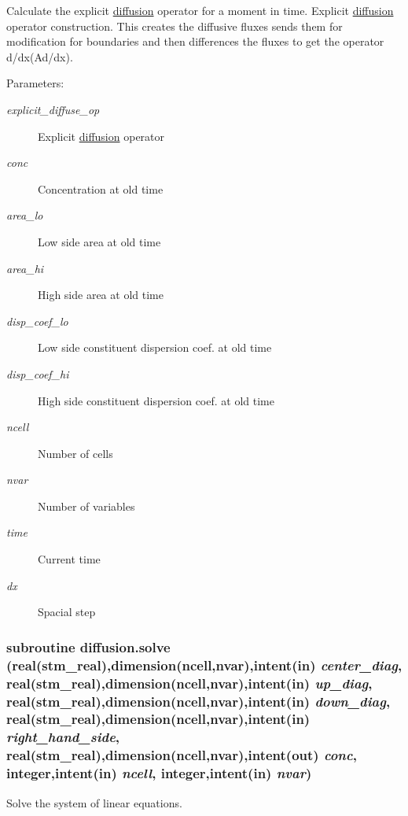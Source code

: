 Calculate the explicit \hyperlink{a00056}{diffusion} operator for a moment in time. Explicit \hyperlink{a00056}{diffusion} operator construction. This creates the diffusive fluxes sends them for modification for boundaries and then differences the fluxes to get the operator d/dx(Ad/dx). 

\begin{Desc}
\item[Parameters:]
\begin{description}
\item[{\em explicit\_\-diffuse\_\-op}]Explicit \hyperlink{a00056}{diffusion} operator\item[{\em conc}]Concentration at old time\item[{\em area\_\-lo}]Low side area at old time\item[{\em area\_\-hi}]High side area at old time \item[{\em disp\_\-coef\_\-lo}]Low side constituent dispersion coef. at old time\item[{\em disp\_\-coef\_\-hi}]High side constituent dispersion coef. at old time\item[{\em ncell}]Number of cells\item[{\em nvar}]Number of variables\item[{\em time}]Current time\item[{\em dx}]Spacial step \end{description}
\end{Desc}
\hypertarget{a00056_1fe7c419971f40e38980d90c9b0270b3}{
\subsubsection[{solve}]{\setlength{\rightskip}{0pt plus 5cm}subroutine diffusion.solve (real(stm\_\-real),dimension(ncell,nvar),intent(in) {\em center\_\-diag}, \/  real(stm\_\-real),dimension(ncell,nvar),intent(in) {\em up\_\-diag}, \/  real(stm\_\-real),dimension(ncell,nvar),intent(in) {\em down\_\-diag}, \/  real(stm\_\-real),dimension(ncell,nvar),intent(in) {\em right\_\-hand\_\-side}, \/  real(stm\_\-real),dimension(ncell,nvar),intent(out) {\em conc}, \/  integer,intent(in) {\em ncell}, \/  integer,intent(in) {\em nvar})}}
\label{a00056_1fe7c419971f40e38980d90c9b0270b3}


Solve the system of linear equations. 

